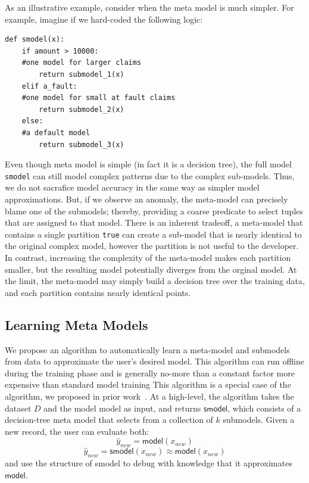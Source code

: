 As an illustrative example, consider when the meta model is much simpler.
For example, imagine if we hard-coded the following logic:
\begin{lstlisting}
def smodel(x):
    if amount > 10000:
    #one model for larger claims
        return submodel_1(x)
    elif a_fault:
    #one model for small at fault claims
        return submodel_2(x)
    else:
    #a default model
        return submodel_3(x)
\end{lstlisting}
Even though meta model is simple (in fact it is a decision tree), the full model \texttt{smodel} can still model complex patterns due to the complex sub-models.  Thus, we do not sacrafice model accuracy in the same way as simpler model approximations.
But, if we observe an anomaly, the meta-model can precisely blame one of the submodels; thereby, providing a coarse predicate to select tuples that are assigned to that model.
There is an inherent tradeoff, a meta-model that contains a single partition \texttt{true} can create a sub-model that is nearly identical to the original complex model, however the partition is not useful to the developer.  In contrast, increasing the complexity of the meta-model makes each partition smaller, but the resulting model potentially diverges from the orginal model.  At the limit, the meta-model may simply build a decision tree over the training data, and each partition contains nearly identical points.

\subsection{Learning Meta Models} 
We propose an algorithm to automatically learn a meta-model and submodels from data to approximate the user's desired model.
This algorithm can run offline during the training phase and is generally no-more than a constant factor more expensive than standard model training
This algorithm is a special case of the algorithm, we proposed in prior work~\cite{DBLP:journals/corr/KrishnanGLMPG16, krishnan17}. At a high-level, the algorithm takes the dataset $D$ and the model \textsf{model} as input, and returns $\textsf{smodel}$, which consists of a decision-tree meta model that selects from a collection of $k$ submodels. Given a new record, the user can evaluate both:
\[
\hat{y}_{new} = \textsf{model}(x_{new})
\]
\[
\hat{y}_{new} = \textsf{smodel}(x_{new}) \approx \textsf{model}(x_{new})
\]
and use the structure of \textsf{smodel} to debug with knowledge that it approximates $\textsf{model}$.


